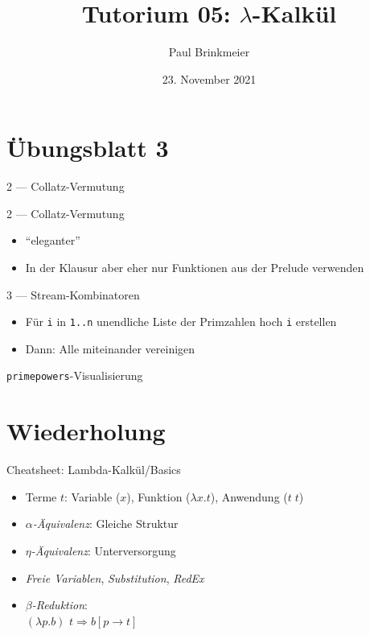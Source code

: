 \documentclass{beamer}
\title{Tutorium 05: $\lambda$-Kalkül}
\author{Paul Brinkmeier}
\institute{Tutorium Programmierparadigmen am KIT}
\date{23. November 2021}
\begin{document}
\begin{frame}
	\titlepage
\end{frame}

\section{Übungsblatt 3}

\begin{frame}{2 --- Collatz-Vermutung}
\end{frame}

\begin{frame}{2 --- Collatz-Vermutung}

	\begin{itemize}
		\item \enquote{eleganter}
		\item In der Klausur aber eher nur Funktionen aus der Prelude verwenden
	\end{itemize}
\end{frame}

\begin{frame}{3 --- Stream-Kombinatoren}

	\begin{itemize}
		\item Für \texttt{i} in \texttt{1..n} unendliche Liste der Primzahlen hoch \texttt{i} erstellen
		\item Dann: Alle miteinander vereinigen
	\end{itemize}
\end{frame}

\begin{frame}{\texttt{primepowers}-Visualisierung}
    
\end{frame}

\section{Wiederholung}

\begin{frame}{Cheatsheet: Lambda-Kalkül/Basics}
  \begin{itemize}
    \item Terme $t$: Variable ($x$), Funktion ($\lambda x . t$), Anwendung ($t \; t$)
    \item \emph{$\alpha$-Äquivalenz}: Gleiche Struktur
    \item \emph{$\eta$-Äquivalenz}: Unterversorgung
    \item \emph{Freie Variablen}, \emph{Substitution}, \emph{RedEx}
    \item \emph{$\beta$-Reduktion}: \\
          $(\lambda{}p.b)$ $t \Rightarrow b\left[p\rightarrow{}t\right]$
  \end{itemize}
\end{frame}
\end{document}
